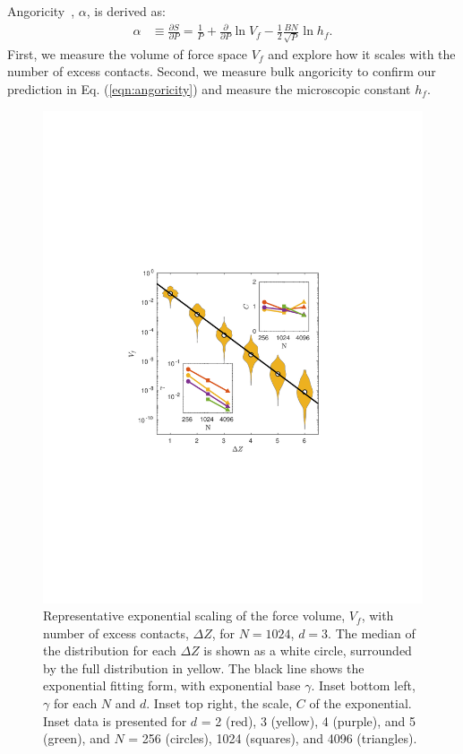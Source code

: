 Angoricity~\cite{edwards_distribution_2008}, $\alpha$, is derived as:
%
\begin{align}
\label{eqn:angoricity}
\alpha &\equiv \frac{\partial S}{\partial P} = \frac{1}{P}  + \frac{\partial }{\partial P}\ln{V_f} - \frac{1}{2} \frac{BN}{\sqrt{P}}\ln{h_f}.
\end{align}
%
First, we measure the volume of force space $V_f$ and explore how it scales with the number of excess contacts. Second, we measure bulk angoricity to confirm our prediction in Eq. (\ref{eqn:angoricity}) and measure the microscopic constant $h_f$.

\begin{figure}[h!]
\centering
\includegraphics[width=\columnwidth, trim=137 240 165 254, clip]{forceVolumeEntropyPaper/volumeInset.pdf}
\caption{Representative exponential scaling of the force volume, $V_f$, with number of excess contacts, $\Delta Z$, for $N=1024$, $d=3$. The median of the distribution for each $\Delta Z$ is shown as a white circle, surrounded by the full distribution in yellow. The black line shows the exponential fitting form, with exponential base $\gamma$. Inset bottom left, $\gamma$ for each $N$ and $d$. Inset top right, the scale, $C$ of the exponential. Inset data is presented for $d$ = 2 (red), 3 (yellow), 4 (purple), and 5 (green), and $N$ = 256 (circles), 1024 (squares), and 4096 (triangles).}
\label{volumePlot}
\end{figure}

